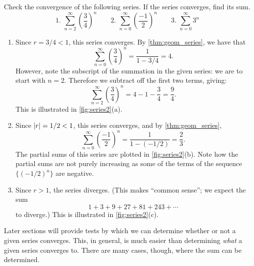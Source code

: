 \begin{example}\label{ex_series2}%
Check the convergence of the following series. If the series converges, find its sum.
\[
 \text{1. }\sum_{n=2}^\infty \left(\frac34\right)^n\qquad
 \text{2. }\sum_{n=0}^\infty \left(\frac{-1}{2}\right)^n\qquad
 \text{3. }\sum_{n=0}^\infty 3^n
\]
\solution
\begin{enumerate}
\item		Since $r=3/4<1$, this series converges. By \autoref{thm:geom_series}, we have that
\[\sum_{n=0}^\infty \left(\frac34\right)^n = \frac{1}{1-3/4} = 4.\]
However, note the subscript of the summation in the given series: we are to start with $n=2$. Therefore we subtract off the first two terms, giving:
\[\sum_{n=2}^\infty \left(\frac34\right)^n = 4 - 1 - \frac34 = \frac94.\]
This is illustrated in \autoref{fig:series2}(a).

\item	Since $\left\lvert r \right\rvert = 1/2 < 1$, this series converges, and by \autoref{thm:geom_series},
\[\sum_{n=0}^\infty \left(\frac{-1}{2}\right)^n = \frac{1}{1-(-1/2)} = \frac23.\]
The partial sums of this series are plotted in \autoref{fig:series2}(b). Note how the partial sums are not purely increasing as some of the terms of the sequence $\{(-1/2)^n\}$ are negative.

\item		Since $r>1$, the series diverges. (This makes ``common sense''; we expect the sum
\[1+3+9+27 + 81+243+\dotsb\]
to diverge.) This is illustrated in \autoref{fig:series2}(c).
\end{enumerate}
\end{example}

Later sections will provide tests by which we can determine whether or not a given series converges. This, in general, is much easier than determining \emph{what} a given series converges to. There are many cases, though, where the sum can be determined.

